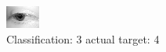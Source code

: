 \begin{figure}[h!]
\begin{center}
\includegraphics[width=0.60\columnwidth]{figures/ID2562_class_3_target_4.png}
\end{center}
\caption{ Classification: 3 actual target: 4}
\label{fig:ID2562_class_3_target_4}
\end{figure}
